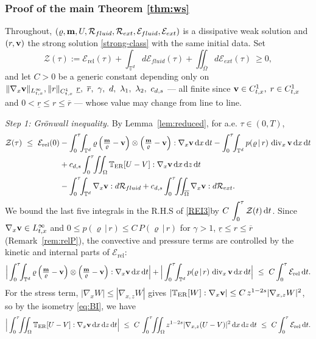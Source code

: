 \documentclass[12pt,a4paper,twoside]{article}
\newcommand{\vr}{\varrho}
\newcommand{\vv}{\vc{v}}
\newcommand{\vc}[1]{{\bf #1}}
\newcommand{\dx}{{\,\rm d} {x}}
\newcommand{\dt}{{\,\rm d} t }
\newcommand{\lr}[1]{\left( #1 \right)}
\newcommand{\Erel}{\mathcal{E}_{\mathrm{rel}}}
\numberwithin{equation}{section}%
\newcommand{\T}{\mathbb{T}}
\newcommand{\vm}{\vc{m}}
\newcommand{\dz}{{\rm d} z}
\newcommand{\Gradx}{\nabla_x}
\newcommand{\Gradxz}{\nabla_{x,z}}
\newcommand{\Divx}{\operatorname{div}_x}
\begin{document}
\subsubsection{Proof of the main Theorem \ref{thm:ws}}

\begin{pf}
Throughout, $(\vr,\vm,U,\mathcal R_{fluid},\mathcal R_{ext},\mathcal E_{fluid},\mathcal E_{ext})$ is a
dissipative weak solution and $(r,\vv)$ the strong solution \eqref{strong-class} with the same
initial data. Set
\[
\mathcal Z(\tau):=\Erel(\tau)+\int_{\mathbb T^d}d\mathcal E_{fluid}(\tau)
+\iint_{\overline\Omega}d\mathcal E_{ext}(\tau)\ \ge 0 ,
\]
and let $C>0$ be a generic constant depending only on
$\|\Gradx\vv\|_{L^\infty_{t,x}}, \| r\|_{C^1_{t,x}}\ \underline r,\ \overline r,\ \gamma,\ d,\ \lambda_1,\ \lambda_2, \ c_{d,s}$
--- all finite since $\vv\in C^1_{t,x},\; r\in C^1_{t,x}$ and $0<\underline r\le r\le\overline r$ --- whose value may
change from line to line.

\emph{Step 1: Gr\"onwall inequality.} By Lemma~\ref{lem:reduced}, for a.e. $\tau\in(0,T)$,
\begin{equation}\label{REI3}
	\begin{aligned}
		\mathcal Z(\tau)\ \le\ \Erel(0)
		&- \int_0^\tau\!\!\int_{\mathbb T^d} \vr\lr{\tfrac{\vm}{\vr}-\vv}\otimes\lr{\tfrac{\vm}{\vr}-\vv}:\Gradx\vv \dx \dt
		- \int_0^\tau\!\!\int_{\mathbb T^d} p(\vr\,|\,r)\,\Divx\vv \dx \dt\\
		&+ c_{d,s}\int_0^\tau\!\!\iint_\Omega \T_{\rm ER}[U-V]:\Gradx\vv \dx \,\dz \dt \\
		&
		- \int_0^\tau\!\!\int_{\mathbb T^d} \Gradx\vv : d\mathcal R_{fluid}
		+ c_{d,s}\int_0^\tau\!\!\iint_{\overline\Omega} \Gradx\vv : d\mathcal R_{ext} .
	\end{aligned}
\end{equation}
We bound the last five integrals in the R.H.S of \eqref{REI3}by $\displaystyle C\,\int_0^\tau \mathcal Z(t) \dt$. Since $\Gradx\vv\in L^\infty_{t,x}$ and
$0\le p(\vr\,|\,r)\le C\,P(\vr\,|\,r)$ for $\gamma>1$, $\underline r\le r\le\overline r$
(Remark~\ref{rem:relP}), the convective and pressure terms are controlled by the kinetic and
internal parts of $\Erel$:
\[
\Big|\int_0^\tau\!\!\int_{\mathbb T^d}\vr\lr{\tfrac{\vm}{\vr}-\vv}\otimes\lr{\tfrac{\vm}{\vr}-\vv}:\Gradx\vv \dx \dt  \Big| 
+\Big|\int_0^\tau\!\!\int_{\mathbb T^d}p(\vr\,|\,r)\,\Divx\vv \dx \dt  \Big| 
\ \le\ C\int_0^\tau\Erel \dt .
\]
For the stress term, $|\Gradx W|\le|\Gradxz W|$ gives
$|\T_{\rm ER}[W]:\Gradx\vv|\le C\,z^{1-2s}|\Gradxz W|^2$, so by the isometry \eqref{eq:BI}, we have
\[
\Big| \int_0^\tau\!\!\iint_\Omega\T_{\rm ER}[U-V]:\Gradx\vv \dx\, \dz \dt\Big|
\ \le\ C\,\int_0^\tau\!\!\iint_\Omega z^{1-2s}|\Gradxz(U-V)|^2 \dx\, \dz \dt
\ \le\ C\int_0^\tau\Erel \dt .
\]



\end{pf}
\end{document}
